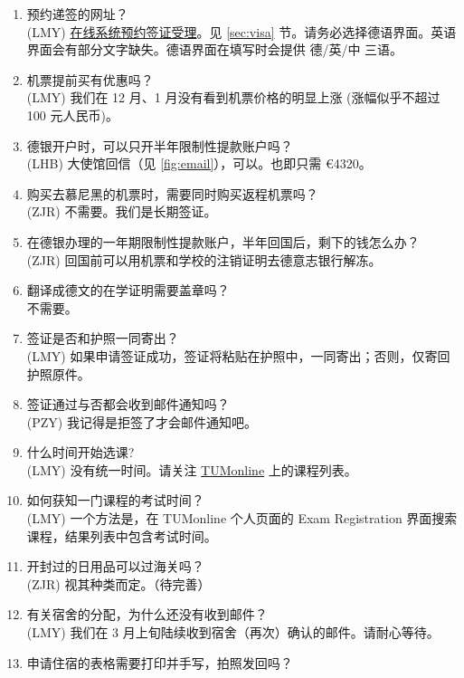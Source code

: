 \begin{enumerate}
  (ZJR) 是。计划好时间后尽快预约。不是每周都能去递签。(LMY) 一周中也可能只有一天能够递签。
  \item 预约递签的网址？ \\
  (LMY) \href{https://service2.diplo.de/rktermin/extern/choose_category.do?locationCode=peki&realmId=12&categoryId=156&request_locale=de}{在线系统预约签证受理}。见 \ref{sec:visa} 节。请务必选择德语界面。英语界面会有部分文字缺失。德语界面在填写时会提供 德/英/中 三语。
  \item 机票提前买有优惠吗？ \\
  (LMY) 我们在 12 月、1 月没有看到机票价格的明显上涨 (涨幅似乎不超过 100 元人民币)。
  \item 德银开户时，可以只开半年限制性提款账户吗？ \\
  (LHB) 大使馆回信（见 \ref{fig:email}），可以。也即只需 \euro{4320}。
  \item 购买去慕尼黑的机票时，需要同时购买返程机票吗？ \\
  (ZJR) 不需要。我们是长期签证。
  \item 在德银办理的一年期限制性提款账户，半年回国后，剩下的钱怎么办？ \\
  (ZJR) 回国前可以用机票和学校的注销证明去德意志银行解冻。
  \item 翻译成德文的在学证明需要盖章吗？ \\
  不需要。
  \item 签证是否和护照一同寄出？ \\
  (LMY) 如果申请签证成功，签证将粘贴在护照中，一同寄出；否则，仅寄回护照原件。
  \item 签证通过与否都会收到邮件通知吗？ \\
  (PZY) 我记得是拒签了才会邮件通知吧。
  \item 什么时间开始选课? \\
  (LMY) 没有统一时间。请关注 \href{campus.tum.de}{TUMonline} 上的课程列表。
  \item 如何获知一门课程的考试时间？ \\
  (LMY) 一个方法是，在 TUMonline 个人页面的 Exam Registration 界面搜索课程，结果列表中包含考试时间。
  \item 开封过的日用品可以过海关吗？ \\
  (ZJR) 视其种类而定。（待完善）
  \item 有关宿舍的分配，为什么还没有收到邮件？ \\
  (LMY) 我们在 3 月上旬陆续收到宿舍（再次）确认的邮件。请耐心等待。
  \item 申请住宿的表格需要打印并手写，拍照发回吗？ \\

\end{enumerate}
